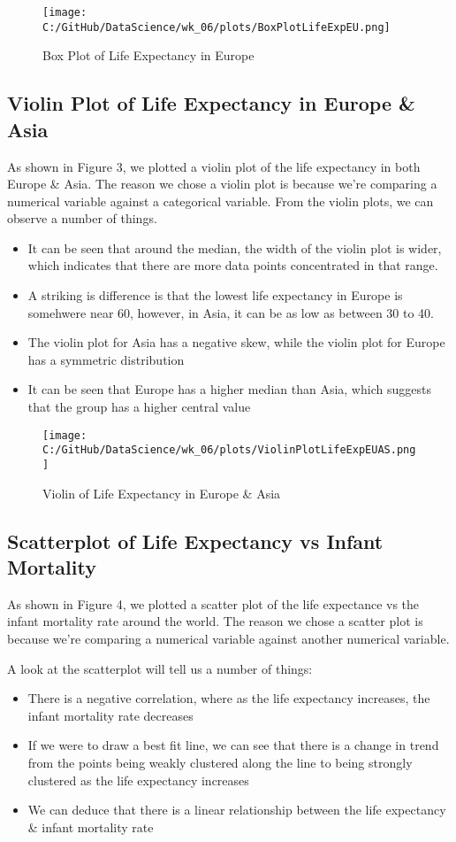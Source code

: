 \documentclass[a4paper, twocolumn]{article}
\begin{document}
\begin{figure}[htbp] 
    \centering
    \texttt{[image: C:/GitHub/DataScience/wk\_06/plots/BoxPlotLifeExpEU.png]}
    \caption{Box Plot of Life Expectancy in Europe} 
\end{figure}


\subsection{Violin Plot of Life Expectancy in Europe \& Asia}
As shown in Figure 3, we plotted a violin plot of the life expectancy in both Europe \& Asia. The reason we chose a 
violin plot is because we're comparing a numerical variable against a categorical variable. From the violin plots,
we can observe a number of things.

\begin{itemize}
    \item It can be seen that around the median, the width of the violin plot is wider, which indicates that there
    are more data points concentrated in that range. 
    \item A striking is difference is that the lowest life expectancy in Europe is somehwere near 60, however, in 
    Asia, it can be as low as between 30 to 40.
    \item The violin plot for Asia has a negative skew, while the violin plot for Europe has a symmetric distribution
    \item It can be seen that Europe has a higher median than Asia, which suggests that the group has a higher
    central value 
\end{itemize}


\begin{figure}[htbp] 
    \centering
    \texttt{[image: C:/GitHub/DataScience/wk\_06/plots/ViolinPlotLifeExpEUAS.png]}
    \caption{Violin of Life Expectancy in Europe \& Asia} 
\end{figure}

\subsection{Scatterplot of Life Expectancy vs Infant Mortality}
As shown in Figure 4, we plotted a scatter plot of the life expectance vs the infant mortality rate around the world.
The reason we chose a scatter plot is because we're comparing a numerical variable against another numerical 
variable. 

A look at the scatterplot will tell us a number of things:
\begin{itemize}
    \item There is a negative correlation, where as the life expectancy increases, the infant mortality rate decreases
    \item If we were to draw a best fit line, we can see that there is a change in trend from the points being 
    weakly clustered along the line to being strongly clustered as the life expectancy increases
    \item We can deduce that there is a linear relationship between the life expectancy \& infant mortality rate
\end{itemize}
\end{document}
